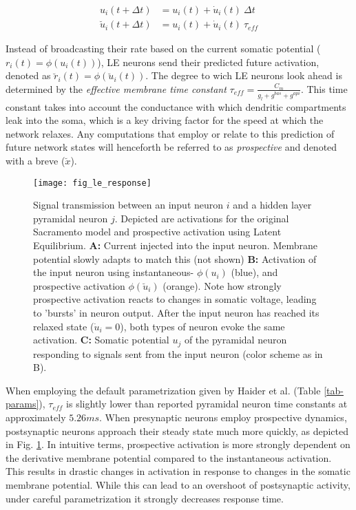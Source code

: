 \begin{align}
  u_i(t+ \Delta t)          & = u_i(t) + \dot{u}_i(t) \ \Delta t \label{eq-r-t-sacramento} \\
  \breve{u}_i(t + \Delta t) & = u_i(t) + \dot{u}_i(t) \ \tau_{eff} \label{eq-r-t-haider}
\end{align}

Instead of broadcasting their rate based on the current somatic potential ($r_i(t) = \phi(u_i(t))$), LE neurons send
their predicted future activation, denoted as $\breve{r}_i(t) = \phi(\breve{u}_i(t))$. The degree to wich LE neurons
look ahead is determined by the \textit{effective membrane time constant} $\tau_{eff} = \frac{C_m}{g_l + g^{bas} +
g^{api}}$. This time constant takes into account the conductance with which dendritic compartments leak into the soma,
which is a key driving factor for the speed at which the network relaxes. Any computations that employ or relate to this
prediction of future network states will henceforth be referred to as \textit{prospective} and denoted with a breve
($\breve{x}$).


\begin{figure}[h]
  \centering
  \texttt{[image: fig\_le\_response]}
  \caption{Signal transmission between an input neuron $i$ and a hidden layer pyramidal neuron $j$. Depicted are
    activations for the original Sacramento model and prospective activation using Latent Equilibrium. \textbf{A:}
    Current injected into the input neuron. Membrane potential slowly adapts to match this (not shown) \textbf{B:}
    Activation of the input neuron using instantaneous- $\phi(u_i)$ (blue), and prospective activation
    $\phi(\breve{u}_i)$ (orange). Note how strongly prospective activation reacts to changes in somatic voltage, leading
    to 'bursts' in neuron output. After the input neuron has reached its relaxed state ($\dot{u}_i = 0$), both types of
    neuron evoke the same activation. \textbf{C:} Somatic potential $u_j$ of the pyramidal neuron responding to signals
    sent from the input neuron (color scheme as in B).}
  \label{fig-comparison-le}
\end{figure}

When employing the default parametrization given by Haider et al. (Table \ref{tab-params}), $\tau_{eff}$ is
slightly lower than reported pyramidal neuron time constants \citep{McCormick1985} at approximately $5.26ms$. When
presynaptic neurons employ prospective dynamics, postsynaptic neurons approach their steady state much more quickly, as
depicted in Fig. \ref{fig-comparison-le}. In intuitive terms, prospective activation is more strongly dependent on the
derivative membrane potential compared to the instantaneous activation. This results in drastic changes in activation
in response to changes in the somatic membrane potential. While this can lead to an overshoot of postsynaptic activity,
under careful parametrization it strongly decreases response time.   


